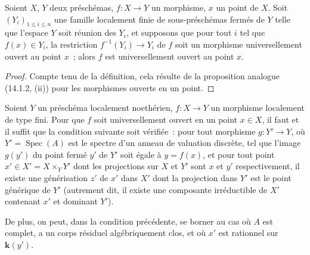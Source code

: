 \begin{proposition}[14.3.5]
\label{IV.14.3.5-fr}
Soient $X$, $Y$ deux préschémas, $f:X\to Y$ un morphisme, $x$ un point de $X$.
Soit $(Y_i)_{1\leq i\leq n}$ une famille localement finie de sous-préschémas
fermés de $Y$ telle que l'espace $Y$ soit réunion des $Y_i$, et supposons que pour
tout $i$ tel que $f(x)\in Y_i$, la restriction $f^{-1}(Y_i)\to Y_i$ de $f$ soit un
morphisme universellement ouvert au point $x$~; alors $f$ est universellement
ouvert au point $x$.
\end{proposition}

\begin{proof}
Compte tenu de la définition, cela résulte de la proposition analogue (14.1.2,
(ii)) pour les morphismes ouverts en un point.
\end{proof}

\begin{proposition}[14.3.6]
\label{IV.14.3.6-fr}
Soient $Y$ un préschéma localement noethérien, $f:X\to Y$ un morphisme localement
de type fini. Pour que $f$ soit universellement ouvert en un point $x\in X$, il
faut et il suffit que la condition suivante soit vérifiée~: pour tout morphisme
$g:Y'\to Y$, où $Y'=\operatorname{Spec}(A)$ est le spectre d'un anneau de
valuation discrète, tel que l'image $g(y')$ du point fermé $y'$ de $Y'$ soit égale
à $y=f(x)$, et pour tout point $x'\in X'=X\times_Y Y'$ dont les projections sur
$X$ et $Y'$ sont $x$ et $y'$ respectivement, il existe une générisation $z'$ de
$x'$ dans $X'$ dont la projection dans $Y'$ est le point générique de $Y'$
\textup{(autrement dit,} il existe une composante irréductible de $X'$ contenant $x'$ et
dominant $Y'$\textup{)}.


De plus, on peut, dans la condition précédente, se borner au cas où $A$ est
complet, a un corps résiduel algébriquement clos, et où $x'$ est rationnel sur
$\boldsymbol{k}(y')$.
\end{proposition}

